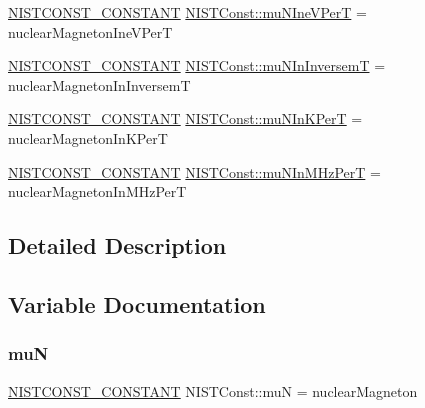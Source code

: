 \begin{DoxyCompactItemize}
\item 
\mbox{\hyperlink{group___n_i_s_t_const-_macros_ga2b0fc1d7452373f816175dd86ce26729}{N\+I\+S\+T\+C\+O\+N\+S\+T\+\_\+\+C\+O\+N\+S\+T\+A\+NT}} \mbox{\hyperlink{group___n_i_s_t_const-_nuclear_magneton_gae0347b2edd524316b9bd807bbf9feb7d}{N\+I\+S\+T\+Const\+::mu\+N\+Ine\+V\+PerT}} = nuclear\+Magneton\+Ine\+V\+PerT
\item 
\mbox{\hyperlink{group___n_i_s_t_const-_macros_ga2b0fc1d7452373f816175dd86ce26729}{N\+I\+S\+T\+C\+O\+N\+S\+T\+\_\+\+C\+O\+N\+S\+T\+A\+NT}} \mbox{\hyperlink{group___n_i_s_t_const-_nuclear_magneton_ga02ac16d965def01b1cb39eb084c98006}{N\+I\+S\+T\+Const\+::mu\+N\+In\+InversemT}} = nuclear\+Magneton\+In\+InversemT
\item 
\mbox{\hyperlink{group___n_i_s_t_const-_macros_ga2b0fc1d7452373f816175dd86ce26729}{N\+I\+S\+T\+C\+O\+N\+S\+T\+\_\+\+C\+O\+N\+S\+T\+A\+NT}} \mbox{\hyperlink{group___n_i_s_t_const-_nuclear_magneton_ga338d2bb676392956a4aaf46f201678d8}{N\+I\+S\+T\+Const\+::mu\+N\+In\+K\+PerT}} = nuclear\+Magneton\+In\+K\+PerT
\item 
\mbox{\hyperlink{group___n_i_s_t_const-_macros_ga2b0fc1d7452373f816175dd86ce26729}{N\+I\+S\+T\+C\+O\+N\+S\+T\+\_\+\+C\+O\+N\+S\+T\+A\+NT}} \mbox{\hyperlink{group___n_i_s_t_const-_nuclear_magneton_gaa05aa79a9968b213a14c4c6f41c27d1b}{N\+I\+S\+T\+Const\+::mu\+N\+In\+M\+Hz\+PerT}} = nuclear\+Magneton\+In\+M\+Hz\+PerT
\end{DoxyCompactItemize}


\subsection{Detailed Description}


\subsection{Variable Documentation}
\mbox{\label{group___n_i_s_t_const-_nuclear_magneton_ga2489f9762b0a9097d4a882609c12038a}} 
\subsubsection{\texorpdfstring{muN}{muN}}
{\footnotesize\ttfamily \mbox{\hyperlink{group___n_i_s_t_const-_macros_ga2b0fc1d7452373f816175dd86ce26729}{N\+I\+S\+T\+C\+O\+N\+S\+T\+\_\+\+C\+O\+N\+S\+T\+A\+NT}} N\+I\+S\+T\+Const\+::muN = nuclear\+Magneton}

